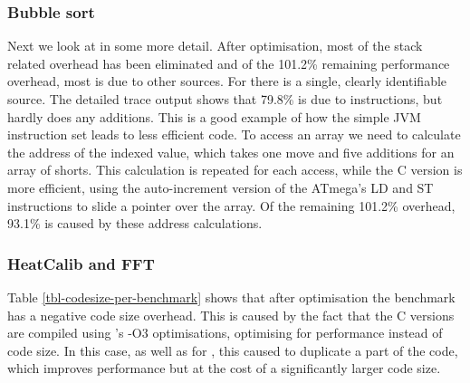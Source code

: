 \subsubsection{Bubble sort}
\label{sec-evaluation-bubble-sort}
Next we look at  in some more detail. After optimisation, most of the stack related overhead has been eliminated and of the 101.2\% remaining performance overhead, most is due to other sources. For  there is a single, clearly identifiable source. The detailed trace output shows that 79.8\% is due to  instructions, but  hardly does any additions. This is a good example of how the simple JVM instruction set leads to less efficient code. To access an array we need to calculate the address of the indexed value, which takes one move and five additions for an array of shorts. This calculation is repeated for each access, while the C version is more efficient, using the auto-increment version of the ATmega's LD and ST instructions to slide a pointer over the array. Of the remaining 101.2\% overhead, 93.1\% is caused by these address calculations.

%

\subsubsection{HeatCalib and FFT}
Table \ref{tbl-codesize-per-benchmark} shows that after optimisation the  benchmark has a negative code size overhead. This is caused by the fact that the C versions are compiled using 's -O3 optimisations, optimising for performance instead of code size. In this case, as well as for , this caused  to duplicate a part of the code, which improves performance but at the cost of a significantly larger code size.


